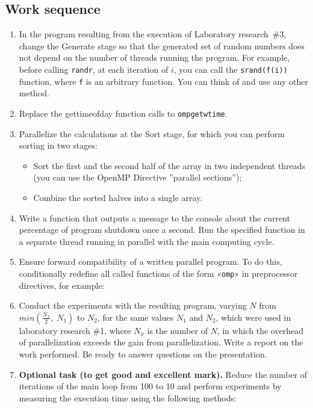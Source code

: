 { %
	\subsection{Work sequence}
	\begin{enumerate}
		\item	In the program resulting from the execution of Laboratory research~\#3, change the Generate stage so that the generated set of random numbers does not depend on the number of threads running the program. For example, before calling \texttt{rand\textunderscore r},  at each iteration of $i$, you can call the \texttt{srand(f(i))} function, where \texttt{f} is an arbitrary function. You can think of and use any other method.
		\item Replace the gettimeofday function calls to \texttt{omp\textunderscore get\textunderscore wtime}.
		\item Parallelize the calculations at the Sort stage, for which you can perform sorting in two stages:
			\begin{itemize}
				\item Sort the first and the second half of the array in two independent threads (you can use the OpenMP Directive ''parallel sections''); 
				\item Combine the sorted halves into a single array.
			\end{itemize}
		\item Write a function that outputs a message to the console about the current percentage of program shutdown once a second. Run the specified function in a separate thread running in parallel with the main computing cycle.
		\item Ensure forward compatibility of a written parallel program. To do this, conditionally redefine all called functions of the form «\texttt{omp\textunderscore *}» in preprocessor directives, for example:
			\begin{figure}[H]
				
			\end{figure}
		\item Conduct the experiments with the resulting program, varying $N$ from $min(\frac{N_x}{2},\;N_1)$ to $N_2$, for the same values $N_1$ and $N_2$, which were used in laboratory research \#1, where $N_x$ is the number of $N$, in which the overhead of parallelization exceeds the gain from parallelization. Write a report on the work performed. Be ready to answer questions on the presentation.
		\item\textbf{Optional task (to get good and excellent mark).} Reduce the number of iterations of the main loop from 100 to 10 and perform experiments by measuring the execution time using the following methods:

\end{enumerate}}
